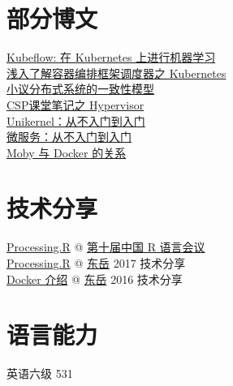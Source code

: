 \documentclass[]{deedy-resume-openfont}
\begin{document}
\begin{minipage}[t]{0.3\textwidth}
\section{部分博文}
\sectionsep
\href{http://gaocegege.com/Blog/ml%20system/kubeflow}{Kubeflow: 在 Kubernetes 上进行机器学习} \\
\href{http://gaocegege.com/Blog/%E6%BA%90%E7%A0%81%E5%88%86%E6%9E%90/kubernetes-scheduler}{浅入了解容器编排框架调度器之 Kubernetes} \\
\href{http://gaocegege.com/Blog/%E9%9A%8F%E7%AC%94/consistency}{小议分布式系统的一致性模型} \\
\href{http://gaocegege.com/Blog/csp/xen-kvm}{CSP课堂笔记之 Hypervisor} \\
\href{http://gaocegege.com/Blog/%E5%AE%89%E5%88%A9/unikernel-book}{Unikernel：从不入门到入门} \\
\href{http://gaocegege.com/Blog/%E5%AE%89%E5%88%A9/micro-services}{微服务：从不入门到入门} \\
\href{http://gaocegege.com/Blog/moby/moby}{Moby 与 Docker 的关系
} \\
\sectionsep

\section{技术分享}
\sectionsep
\href{http://slides.com/gaocegege/processing-r}{Processing.R} @ \href{http://china-r.org/sh2017/index.html}{第十届中国 R 语言会议} \\
\href{https://docs.google.com/presentation/d/1ylRT4VvydWbR7SyTQzNZOLpkXtgSZJiEl5nmXY1KuJw/edit?usp=sharing}{Processing.R} @ \href{https://zhuanlan.zhihu.com/dongyue}{东岳} 2017 技术分享 \\
\href{https://docs.google.com/presentation/d/1Ru4Dm9TLoyxnJgFqvsCHrb82VT622H-zBSgAe1vJL44/edit?usp=sharing}{Docker 介绍}  @ \href{https://zhuanlan.zhihu.com/dongyue}{东岳} 2016 技术分享 \\
\sectionsep

\section{语言能力}
\sectionsep
英语六级 531 \\
\sectionsep



\end{minipage}
\end{document}
